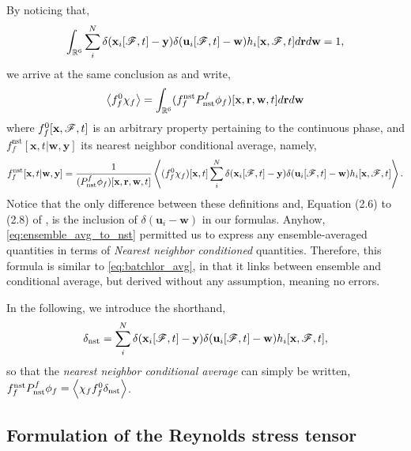 By noticing that, 
\begin{equation}
    \int_{\mathbb{R}^6}
    \sum_i^N 
    \delta(\textbf{x}_i[\mathscr{F},t]-\textbf{y})
    \delta(\textbf{u}_i[\mathscr{F},t]-\textbf{w})
    h_i[\textbf{x},\mathscr{F},t]
    d\textbf{r}
    d\textbf{w} 
    =1,
\end{equation}
we arrive at the same conclusion as \citet{zhang2021ensemble} and write, 
\begin{equation}
    \avg{f_f^0\chi_f}
    = 
    \int_{\mathbb{R}^6}
    (f_f^\text{nst}P_\text{nst}^f\phi_f)[\textbf{x},\textbf{r},\textbf{w},t]
    d\textbf{r}
    d\textbf{w}
    \label{eq:ensemble_avg_to_nst}
\end{equation} 
where $f_f^0[\textbf{x},\mathscr{F},t]$ is an arbitrary property pertaining to the continuous phase, and $f_f^\text{nst}[\textbf{x},t|\textbf{w},\textbf{y}]$ its nearest neighbor conditional average, namely, 
\begin{equation}
    f_f^\text{nst}[\textbf{x},t|\textbf{w},\textbf{y}]
    =\frac{1}{(P_\text{nst}^f\phi_f) [\textbf{x},\textbf{r},\textbf{w},t]}
    \avg{
        (f_f^0
        \chi_f)[\textbf{x},t]
        \sum_i^N 
        \delta(\textbf{x}_i[\FF,t]-\textbf{y})
        \delta(\textbf{u}_i[\FF,t]-\textbf{w})
        h_i[\textbf{x},\FF,t]
    }.
    \label{eq:def_f_nst}
\end{equation}
Notice that the only difference between these definitions and, Equation (2.6) to (2.8) of \citet{zhang2021ensemble}, is the inclusion of $\delta(\textbf{u}_i - \textbf{w})$ in our formulas. 
Anyhow, \ref{eq:ensemble_avg_to_nst} permitted us to express any ensemble-averaged quantities in terms of \textit{Nearest neighbor conditioned} quantities. 
Therefore, this formula is similar to \ref{eq:batchlor_avg}, in that it links between ensemble and conditional average, but derived without any assumption, meaning no errors. 

In the following, we introduce the shorthand, 
\begin{equation*}
    \delta_\text{nst}
    =
    \sum_i^N 
    \delta(\textbf{x}_i[\mathscr{F},t]-\textbf{y})
    \delta(\textbf{u}_i[\mathscr{F},t]-\textbf{w})
    h_i[\textbf{x},\mathscr{F},t],
\end{equation*}
so that the \textit{nearest neighbor  conditional  average} can simply be written, $f_f^\text{nst} P_\text{nst}^f \phi_f = \left<\chi_f f_f^0 \delta_\text{nst}\right>$.

\subsection{Formulation of the Reynolds stress tensor}

